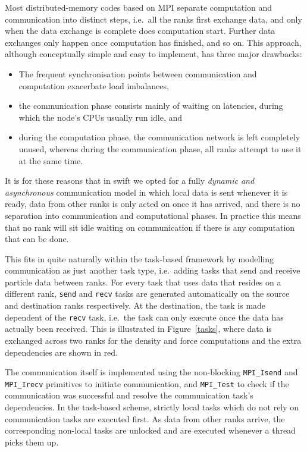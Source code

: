 \documentclass{sig-alternate-05-2015}
\newcommand{\swift}{{\sc swift}\xspace}
\begin{document}
Most distributed-memory codes based on MPI \cite{ref:Snir1998}
separate computation and communication into distinct steps, i.e.~all
the ranks first exchange data, and only when the data exchange is
complete does computation start. Further data exchanges only happen
once computation has finished, and so on.
This approach, although conceptually simple and easy to implement,
has three major drawbacks:
\begin{itemize}
  \item The frequent synchronisation points between communication
    and computation exacerbate load imbalances,
  \item the communication phase consists mainly of waiting on
    latencies, during which the node's CPUs usually run idle, and
  \item during the computation phase, the communication network
    is left completely unused, whereas during the communication
    phase, all ranks attempt to use it at the same time.
\end{itemize}

It is for these reasons that in \swift we opted for a fully
{\em dynamic and asynchronous} communication model in which local
data is sent whenever it is ready, data from other ranks is
only acted on once it has arrived, and there is no separation into
communication and computational phases.
In practice this means that no rank will sit idle waiting on
communication if there is any computation that can be done.

This fits in quite naturally within the task-based framework
by modelling communication as just another task type, i.e.~adding
tasks that send and receive particle data between ranks.
For every task that uses data that resides on a different rank,
{\tt send} and {\tt recv} tasks are generated automatically on the source
and destination ranks respectively.
At the destination, the task is made dependent of the {\tt recv}
task, i.e.~the task can only execute once the data has actually
been received.
This is illustrated in Figure~\ref{tasks}, where data is exchanged across
two ranks for the density and force computations and the extra
dependencies are shown in red.

The communication itself is implemented using the non-blocking
{\tt MPI\_Isend} and {\tt MPI\_Irecv} primitives to initiate
communication, and {\tt MPI\_Test} to check if the communication was
successful and resolve the communication task's dependencies.  In the
task-based scheme, strictly local tasks which do not rely on
communication tasks are executed first.  As data from other ranks
arrive, the corresponding non-local tasks are unlocked and are
executed whenever a thread picks them up.
\end{document}
